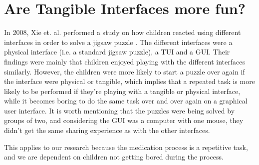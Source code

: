 \section{Are Tangible Interfaces more fun?}
In 2008, Xie et. al. performed a study on how children reacted using different interfaces in order to solve a jigsaw puzzle \cite{xie2008tangibles}. The different interfaces were a physical interface (i.e. a standard jigsaw puzzle), a TUI and a GUI. Their findings were mainly that children enjoyed playing with the different interfaces similarly. However, the children were more likely to start a puzzle over again if the interface were physical or tangible, which implies that a repeated task is more likely to be performed if they're playing with a tangible or physical interface, while it becomes boring to do the same task over and over again on a graphical user interface. It is worth mentioning that the puzzles were being solved by groups of two, and considering the GUI was a computer with one mouse, they didn't get the same sharing experience as with the other interfaces. 


This applies to our research because the medication process is a repetitive task, and we are dependent on children not getting bored during the process.     



